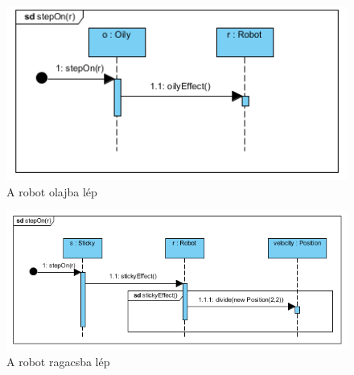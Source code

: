 
\begin{figure}[!htbp]
	\begin{center}
		\includegraphics[width=166mm, center]{./vegleges_statikus_seq/steponoily.png}
		\caption{A robot olajba lép}
	\end{center}
\end{figure}

\begin{figure}[!htbp]
	\begin{center}
		\includegraphics[width=166mm, center]{./vegleges_statikus_seq/steponsticky.png}
		\caption{A robot ragacsba lép}
	\end{center}
\end{figure}

